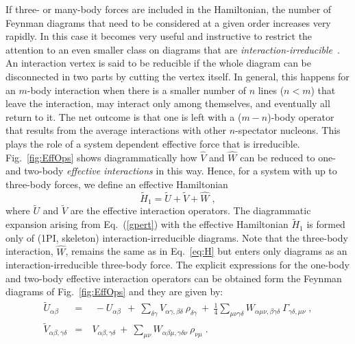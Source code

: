 If three- or many-body forces are included in the Hamiltonian, the number of Feynman diagrams that need to be considered at a given order increases very rapidly. In this case it becomes very useful and instructive to restrict the attention to an even smaller class on diagrams that are  {\em interaction-irreducible}~\cite{ch11_Carbone2013Nov}. An interaction vertex is said to be reducible if the whole diagram can be disconnected in two parts by cutting the vertex itself. In general, this happens for an $m$-body interaction when there is a smaller number of $n$ lines ($n < m$) that leave the interaction, may interact only among themselves, and eventually all return to it. The net outcome is that one is left with a ($m-n$)-body operator that results from the average interactions with other $n$-spectator nucleons. This plays the role of a system dependent effective force that is irreducible. Fig.~\ref{fig:EffOps} shows diagrammatically how  $\widehat{V}$ and $\widehat{W}$  can be reduced to  one- and two-body {\em effective interactions} in this way.
%
Hence, for a system with up to three-body forces, we define an effective Hamiltonian
\begin{equation}
\widetilde H_1= {\widetilde U} + {\widetilde  V} + \widehat W \; ,
\label{eq:Heff}
\end{equation}
where $\widetilde U$ and  $\widetilde V$ are the effective interaction operators. 
The diagrammatic expansion arising from  Eq.~(\ref{gpert}) with the effective Hamiltonian $\widetilde H_1$ is
formed only of (1PI, skeleton) interaction-irreducible diagrams. Note that the three-body interaction, $\widehat W$, remains the same as in Eq.~\eqref{eq:H} but enters only diagrams as an  interaction-irreducible three-body force.  
%
The explicit expressions for the one-body and two-body effective interaction operators can be obtained form the Feynman diagrams of Fig.~\ref{fig:EffOps} and they are given by:
\begin{subequations}
\label{eq:UV_eff}
\begin{eqnarray}
  \label{eq:U_eff}
  \widetilde{U}_{\alpha\beta}&=& ~ ~ -U_{\alpha \beta}  ~ ~ +  ~\sum_{\delta\gamma} V_{\alpha\gamma,\beta\delta}~\rho_{\delta\gamma}
                        ~ +  ~ \frac{1}{4} \sum_{\mu \nu \gamma \delta}W_{\alpha\mu\nu,\beta\gamma\delta}
                   ~\Gamma_{\gamma \delta, \mu \nu}  \; ,
  \\\label{eq:V_eff} 
  \widetilde{V}_{\alpha\beta,\gamma\delta} &=& ~ V_{\alpha\beta,\gamma\delta}  ~+ ~ 
                          \sum_{\mu\nu}W_{\alpha\beta \mu ,\gamma \delta \nu}~\rho_{\nu\mu}  \; .
\end{eqnarray}
\end{subequations}
